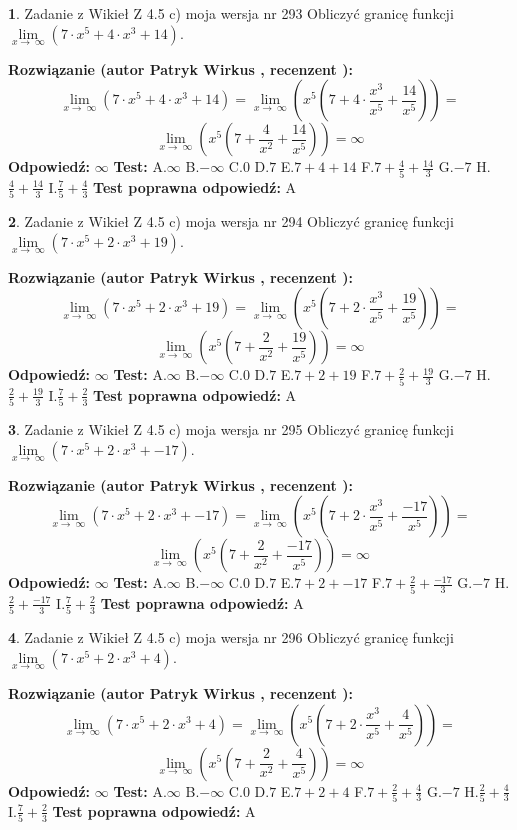 \documentclass[12pt, a4paper]{article}
\theoremstyle{definition} %
\newtheorem{zad}{}
\newcommand{\zadStart}[1]{\begin{zad}#1\newline}
\newcommand{\zadStop}{\end{zad}}
\newcommand{\rozwStart}[2]{\noindent \textbf{Rozwiązanie (autor #1 , recenzent #2): }\newline}
\newcommand{\rozwStop}{\newline}
\newcommand{\odpStart}{\noindent \textbf{Odpowiedź:}\newline}
\newcommand{\odpStop}{\newline}
\newcommand{\testStart}{\noindent \textbf{Test:}\newline}
\newcommand{\testStop}{\newline}
\newcommand{\kluczStart}{\noindent \textbf{Test poprawna odpowiedź:}\newline}
\newcommand{\kluczStop}{\newline}
\begin{document}
\zadStart{Zadanie z Wikieł Z 4.5 c) moja wersja nr 293}
Obliczyć granicę funkcji  $\lim\limits_{x\to\ \infty}(7 \cdot x^{5}+4 \cdot x^{3}+14)$.
\zadStop
\rozwStart{Patryk Wirkus}{}
$$\lim\limits_{x\to\ \infty}(7 \cdot x^{5}+4 \cdot x^{3}+14) = \lim\limits_{x\to\ \infty}(x^{5}(7 +4 \cdot \frac{x^{3}}{x^{5}}+\frac{14}{x^{5}})) =$$ $$\lim\limits_{x\to\ \infty}(x^{5}(7 +\frac{4}{x^{2}}+\frac{14}{x^{5}})) =\infty$$
\rozwStop
\odpStart
$\infty$
\odpStop
\testStart
A.$\infty$ B.$-\infty$ C.$0$ D.$7$ E.$7 + 4 + 14$
F.$7+\frac{4}{5}+\frac{14}{3}$ G.$-7$
H.$\frac{4}{5}+\frac{14}{3}$
I.$\frac{7}{5}+\frac{4}{3}$
\testStop
\kluczStart
A
\kluczStop



\zadStart{Zadanie z Wikieł Z 4.5 c) moja wersja nr 294}
Obliczyć granicę funkcji  $\lim\limits_{x\to\ \infty}(7 \cdot x^{5}+2 \cdot x^{3}+19)$.
\zadStop
\rozwStart{Patryk Wirkus}{}
$$\lim\limits_{x\to\ \infty}(7 \cdot x^{5}+2 \cdot x^{3}+19) = \lim\limits_{x\to\ \infty}(x^{5}(7 +2 \cdot \frac{x^{3}}{x^{5}}+\frac{19}{x^{5}})) =$$ $$\lim\limits_{x\to\ \infty}(x^{5}(7 +\frac{2}{x^{2}}+\frac{19}{x^{5}})) =\infty$$
\rozwStop
\odpStart
$\infty$
\odpStop
\testStart
A.$\infty$ B.$-\infty$ C.$0$ D.$7$ E.$7 + 2 + 19$
F.$7+\frac{2}{5}+\frac{19}{3}$ G.$-7$
H.$\frac{2}{5}+\frac{19}{3}$
I.$\frac{7}{5}+\frac{2}{3}$
\testStop
\kluczStart
A
\kluczStop



\zadStart{Zadanie z Wikieł Z 4.5 c) moja wersja nr 295}
Obliczyć granicę funkcji  $\lim\limits_{x\to\ \infty}(7 \cdot x^{5}+2 \cdot x^{3}+-17)$.
\zadStop
\rozwStart{Patryk Wirkus}{}
$$\lim\limits_{x\to\ \infty}(7 \cdot x^{5}+2 \cdot x^{3}+-17) = \lim\limits_{x\to\ \infty}(x^{5}(7 +2 \cdot \frac{x^{3}}{x^{5}}+\frac{-17}{x^{5}})) =$$ $$\lim\limits_{x\to\ \infty}(x^{5}(7 +\frac{2}{x^{2}}+\frac{-17}{x^{5}})) =\infty$$
\rozwStop
\odpStart
$\infty$
\odpStop
\testStart
A.$\infty$ B.$-\infty$ C.$0$ D.$7$ E.$7 + 2 + -17$
F.$7+\frac{2}{5}+\frac{-17}{3}$ G.$-7$
H.$\frac{2}{5}+\frac{-17}{3}$
I.$\frac{7}{5}+\frac{2}{3}$
\testStop
\kluczStart
A
\kluczStop



\zadStart{Zadanie z Wikieł Z 4.5 c) moja wersja nr 296}
Obliczyć granicę funkcji  $\lim\limits_{x\to\ \infty}(7 \cdot x^{5}+2 \cdot x^{3}+4)$.
\zadStop
\rozwStart{Patryk Wirkus}{}
$$\lim\limits_{x\to\ \infty}(7 \cdot x^{5}+2 \cdot x^{3}+4) = \lim\limits_{x\to\ \infty}(x^{5}(7 +2 \cdot \frac{x^{3}}{x^{5}}+\frac{4}{x^{5}})) =$$ $$\lim\limits_{x\to\ \infty}(x^{5}(7 +\frac{2}{x^{2}}+\frac{4}{x^{5}})) =\infty$$
\rozwStop
\odpStart
$\infty$
\odpStop
\testStart
A.$\infty$ B.$-\infty$ C.$0$ D.$7$ E.$7 + 2 + 4$
F.$7+\frac{2}{5}+\frac{4}{3}$ G.$-7$
H.$\frac{2}{5}+\frac{4}{3}$
I.$\frac{7}{5}+\frac{2}{3}$
\testStop
\kluczStart
A
\kluczStop
\end{document}
